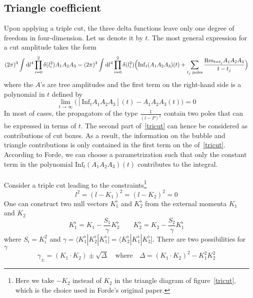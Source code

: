 \subsection*{Triangle coefficient} 
Upon applying a triple cut, the three delta functions leave only one degree of freedom in four-dimension. 
Let us denote it by $t$.
The most general expression for a cut amplitude takes the form 
\begin{equation}\label{tricut}
(2\pi)^3\int\textrm{d} l^4 \prod_{i=0}^2 \delta(l_i^2) A_1A_2A_3 = 
(2\pi)^3\int\textrm{d} l^4 \prod_{i=0}^2 \delta(l_i^2)\Big(\mathrm{Inf}_t(A_1A_2A_3)(t) + \sum_{\textrm{$t_j$ poles}}\frac{\mathrm{Res}_{t = t_j}A_1 A_2 A_3}{t-t_j}\Big)
\end{equation}
where the $A$'s are tree amplitudes and the first term on the right-hand side is a polynomial in $t$ defined by
\begin{equation}
\lim_{t\rightarrow\infty}\big([\mathrm{Inf}_tA_1A_2A_3](t) - A_1A_2A_3(t)\big) = 0
\end{equation}
In most of cases, the propagators of the type $\frac{1}{(l-P)^2}$ contain two poles that can be expressed in terms of $t$. 
The second part of~\cref{tricut} can hence be considered as contributions of cut boxes. 
As a result, the information on the bubble and triangle contributions is only contained in the first term on the \rhs of~\cref{tricut}.
According to Forde, we can choose a parametrization such that only the constant term in the polynomial $\mathrm{Inf}_t(A_1A_2A_3)(t)$ contributes to the integral. 
%
\\\\
Consider a triple cut leading to the constraints\footnote{Here we take $-K_2$ instead of $K_2$ in the triangle diagram of figure~\ref{tricut}, which is the choice used in Forde's original paper.}
\begin{equation}
l^2 = (l-K_1)^2 = (l - K_2)^2 = 0
\end{equation}
One can construct two null vectors $K_1^\flat$ and $K_2^\flat$ from the external momenta $K_1$ and $K_2$ 
\begin{equation}\label{k_flat}
K_1^\flat = K_1 - \frac{S_1}{\gamma}K_2^\flat \quad\quad
K_2^\flat = K_2 - \frac{S_2}{\gamma}K_1^\flat
\end{equation}
%
where $S_i = K_i^2$ and $\gamma = \langle K_1^\flat|K_2^\flat|K_1^\flat] =\langle K_2^\flat|K_1^\flat|K_2^\flat]$.
There are two possibilities for $\gamma$
\begin{equation}\label{sol_for_gamma}
\gamma_{\pm} = (K_1\cdot K_2) \pm\sqrt{\Delta}\quad
\mathrm{where}\quad
\Delta = (K_1\cdot K_2)^2 - K_1^2K_2^2
\end{equation}

